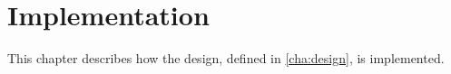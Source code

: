 \chapter{Implementation}\label{part:implementation}

This chapter describes how the design, defined in \cref{cha:design}, is implemented.







